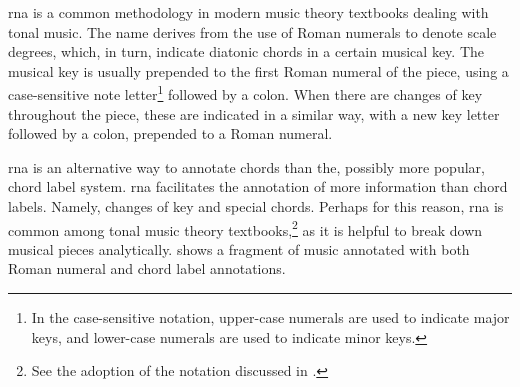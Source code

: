 

\gls{rna} is a common methodology in modern music theory
textbooks dealing with tonal music. The name derives from
the use of Roman numerals to denote scale degrees, which, in
turn, indicate diatonic chords in a certain musical key. The
musical key is usually prepended to the first Roman numeral
of the piece, using a case-sensitive note letter\footnote{In
the case-sensitive notation, upper-case numerals are used to
indicate major keys, and lower-case numerals are used to
indicate minor keys.} followed by a colon. When there are
changes of key throughout the piece, these are indicated in
a similar way, with a new key letter followed by a colon,
prepended to a Roman numeral.

\gls{rna} is an alternative way to annotate chords than the,
possibly more popular, chord label system. \gls{rna}
facilitates the annotation of more information than chord
labels. Namely, changes of key and special chords. Perhaps
for this reason, \gls{rna} is common among tonal music
theory textbooks,\footnote{See the adoption of the notation
discussed in .}
as it is helpful to break down musical pieces analytically.
 shows a fragment of music annotated with
both Roman numeral and chord label annotations.

